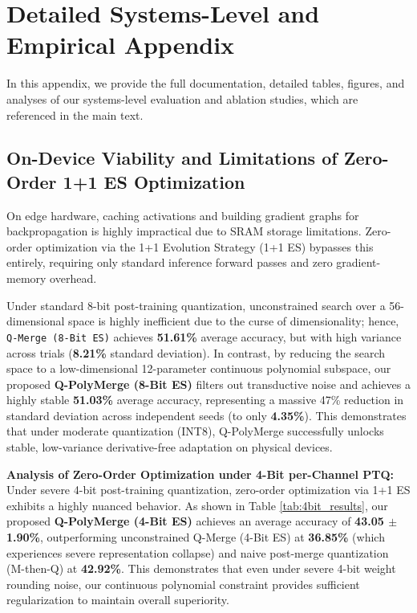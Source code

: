 \section{Detailed Systems-Level and Empirical Appendix}
\label{sec:appendix_systems_ablations}

In this appendix, we provide the full documentation, detailed tables, figures, and analyses of our systems-level evaluation and ablation studies, which are referenced in the main text.

\subsection{On-Device Viability and Limitations of Zero-Order 1+1 ES Optimization}
On edge hardware, caching activations and building gradient graphs for backpropagation is highly impractical due to SRAM storage limitations. Zero-order optimization via the 1+1 Evolution Strategy (1+1 ES) bypasses this entirely, requiring only standard inference forward passes and zero gradient-memory overhead. 

Under standard 8-bit post-training quantization, unconstrained search over a 56-dimensional space is highly inefficient due to the curse of dimensionality; hence, \texttt{Q-Merge (8-Bit ES)} achieves \textbf{51.61\%} average accuracy, but with high variance across trials (\textbf{8.21\%} standard deviation). In contrast, by reducing the search space to a low-dimensional 12-parameter continuous polynomial subspace, our proposed \textbf{Q-PolyMerge (8-Bit ES)} filters out transductive noise and achieves a highly stable \textbf{51.03\%} average accuracy, representing a massive 47\% reduction in standard deviation across independent seeds (to only \textbf{4.35\%}). This demonstrates that under moderate quantization (INT8), Q-PolyMerge successfully unlocks stable, low-variance derivative-free adaptation on physical devices.

\textbf{Analysis of Zero-Order Optimization under 4-Bit per-Channel PTQ:} Under severe 4-bit post-training quantization, zero-order optimization via 1+1 ES exhibits a highly nuanced behavior. As shown in Table \ref{tab:4bit_results}, our proposed \textbf{Q-PolyMerge (4-Bit ES)} achieves an average accuracy of \textbf{43.05 $\pm$ 1.90\%}, outperforming unconstrained Q-Merge (4-Bit ES) at \textbf{36.85\%} (which experiences severe representation collapse) and naive post-merge quantization (M-then-Q) at \textbf{42.92\%}. This demonstrates that even under severe 4-bit weight rounding noise, our continuous polynomial constraint provides sufficient regularization to maintain overall superiority.

